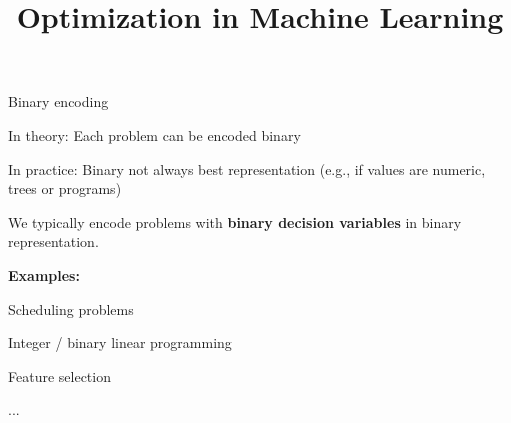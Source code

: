 \documentclass[11pt,compress,t,notes=noshow, xcolor=table]{beamer}
\title{Optimization in Machine Learning}
\begin{document}


\begin{framei}{Binary encoding}
\item In theory: Each problem can be encoded binary
\item In practice: Binary not always best representation (e.g., if values are numeric, trees or programs)
\spacer
\item We typically encode problems with \textbf{binary decision variables} in binary representation.
\spacer
\item[] \textbf{Examples:}
\item Scheduling problems
\item Integer / binary linear programming
\item Feature selection 
\item ... 
\end{framei}
\end{document}
